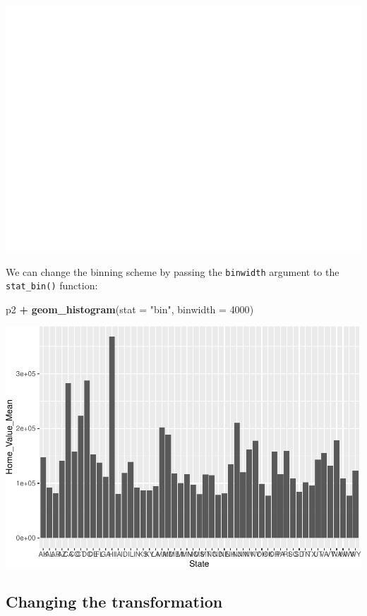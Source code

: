 \documentclass[
]{book}
\newenvironment{Shaded}{\begin{snugshade}}{\end{snugshade}}
\newcommand{\DataTypeTok}[1]{\textcolor[rgb]{0.13,0.29,0.53}{#1}}
\newcommand{\DecValTok}[1]{\textcolor[rgb]{0.00,0.00,0.81}{#1}}
\newcommand{\KeywordTok}[1]{\textcolor[rgb]{0.13,0.29,0.53}{\textbf{#1}}}
\newcommand{\NormalTok}[1]{#1}
\newcommand{\OperatorTok}[1]{\textcolor[rgb]{0.81,0.36,0.00}{\textbf{#1}}}
\newcommand{\StringTok}[1]{\textcolor[rgb]{0.31,0.60,0.02}{#1}}
\begin{document}
\includegraphics{R/Rgraphics/figures/unnamed-chunk-166-1.pdf}

We can change the binning scheme by passing the \texttt{binwidth} argument to the \texttt{stat\_bin()} function:

\begin{Shaded}
\begin{Highlighting}[]
\NormalTok{p2 }\OperatorTok{+}\StringTok{ }\KeywordTok{geom\_histogram}\NormalTok{(}\DataTypeTok{stat =} \StringTok{"bin"}\NormalTok{, }\DataTypeTok{binwidth =} \DecValTok{4000}\NormalTok{)}
\end{Highlighting}
\end{Shaded}

\includegraphics{R/Rgraphics/figures/unnamed-chunk-167-1.pdf}

\hypertarget{changing-the-transformation}{%
\subsection{Changing the transformation}\label{changing-the-transformation}}
\end{document}
